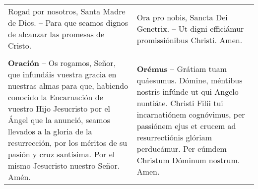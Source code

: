\begin{longtable} { p{} p{} }
    Rogad por nosotros, Santa Madre de Dios. -- Para que seamos dignos de alcanzar las promesas de Cristo.                   
    
     & 
    
    Ora pro nobis, Sancta Dei Genetrix. -- Ut digni efficiámur promissiónibus Christi. Amen. \\\\
    \textbf{Oración} -- Os rogamos, Señor, que infundáis vuestra gracia en nuestras almas para que,
    habiendo conocido la Encarnación de vuestro Hijo Jesucristo por el Ángel que la anunció,
    seamos llevados a la gloria de la resurrección, por los méritos de su pasión y cruz santísima.
    Por el mismo Jesucristo nuestro Señor. Amén.                  
    
     &

    \textbf{Orémus} -- Grátiam tuam quáesumus. Dómine, méntibus nostris infúnde ut qui Angelo nuntiáte.
    Christi Filii tui incarnatiónem cognóvimus, per passiónem ejus et crucem ad resurrectiónis glóriam perducámur.
    Per eúmdem Christum Dóminum nostrum. Amen.
\end{longtable}

